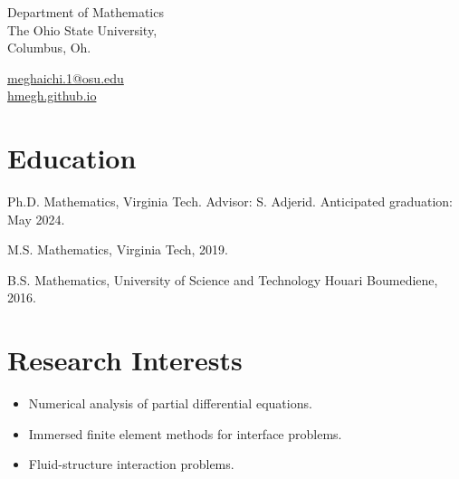 \documentclass[11pt,letterpaper]{report}
\begin{document}
    \raggedright{}

    \namefont{\myname}

    \vspace{1em}
    \begin{minipage}[t]{0.700\textwidth}
        Department of Mathematics \\
       The Ohio State University,  \\
        Columbus, Oh.  
    \end{minipage}\begin{minipage}[t]{0.295\textwidth}
        \flushright{}
        \href{mailto:meghaichi.1@osu.edu}{meghaichi.1@osu.edu} \\
        \href{https://hmegh.github.io}{hmegh.github.io}
    \end{minipage}


    \section*{Education}

    \begin{tablist}

        \item[Ph.D.] \tab{} Mathematics, Virginia Tech. Advisor: S. Adjerid.
        \tab{} Anticipated graduation: May 2024.
        \item[M.S.]  \tab{} Mathematics, Virginia Tech, 2019.
        \item[B.S.]  \tab{} Mathematics, University of Science and Technology Houari Boumediene, 2016.

    \end{tablist}





    \section*{Research Interests}

    \begin{itemize}

        \item Numerical analysis of partial differential equations. 
        \item Immersed finite element methods for interface problems. 
        \item Fluid-structure interaction problems. 

    \end{itemize}
\end{document}
